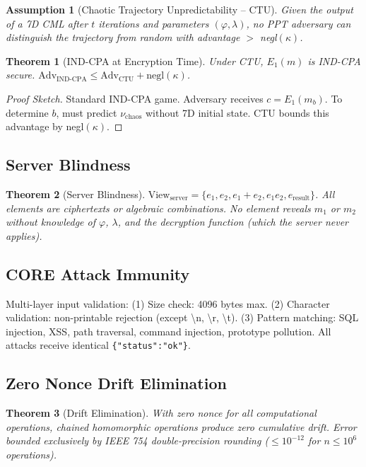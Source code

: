 \documentclass{article}
\newtheorem{theorem}{Theorem}[section]
\newtheorem{assumption}{Assumption}[section]
\begin{document}
\begin{assumption}[Chaotic Trajectory Unpredictability -- CTU]
Given the output of a 7D CML after $t$ iterations and parameters $(\varphi, \lambda)$, no PPT adversary can distinguish the trajectory from random with advantage $>$ negl$(\kappa)$.
\end{assumption}

\begin{theorem}[IND-CPA at Encryption Time]
Under CTU, $E_1(m)$ is IND-CPA secure. $\text{Adv}_{\text{IND-CPA}} \leq \text{Adv}_{\text{CTU}} + \text{negl}(\kappa)$.
\end{theorem}

\begin{proof}[Proof Sketch]
Standard IND-CPA game. Adversary receives $c = E_1(m_b)$. To determine $b$, must predict $\nu_{\text{chaos}}$ without 7D initial state. CTU bounds this advantage by negl$(\kappa)$.
\end{proof}

\subsection{Server Blindness}

\begin{theorem}[Server Blindness]
$\text{View}_{\text{server}} = \{e_1, e_2, e_1+e_2, e_1 e_2, e_{\text{result}}\}$. All elements are ciphertexts or algebraic combinations. No element reveals $m_1$ or $m_2$ without knowledge of $\varphi$, $\lambda$, and the decryption function (which the server never applies).
\end{theorem}

\subsection{CORE Attack Immunity}

Multi-layer input validation: (1) Size check: 4096 bytes max. (2) Character validation: non-printable rejection (except \textbackslash n, \textbackslash r, \textbackslash t). (3) Pattern matching: SQL injection, XSS, path traversal, command injection, prototype pollution. All attacks receive identical \texttt{\{"status":"ok"\}}.

\subsection{Zero Nonce Drift Elimination}

\begin{theorem}[Drift Elimination]
With zero nonce for all computational operations, chained homomorphic operations produce zero cumulative drift. Error bounded exclusively by IEEE 754 double-precision rounding ($\leq 10^{-12}$ for $n \leq 10^6$ operations).
\end{theorem}
\end{document}
